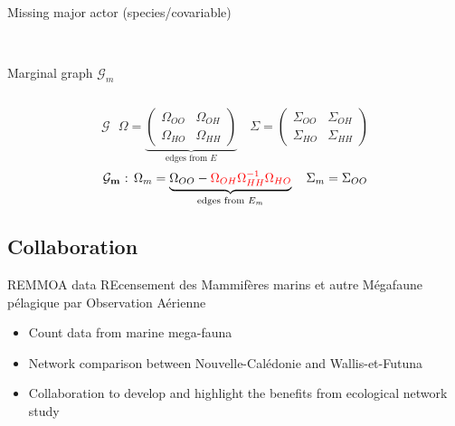 \documentclass[9pt]{beamer}
\newcommand{\emphase}[1]{\textcolor{Complement}{#1}}
\begin{document}
\begin{frame}{Missing major actor (species/covariable)}
\begin{columns}
\begin{column}{0.35\linewidth}
\begin{center}
\\


Marginal graph $\mathcal{G}_m$
\end{center}
\end{column}
\end{columns}
\vspace{0.2cm}
$$\mathbf{\mathcal{G}}\text{ }\Omega=\underbrace{\begin{pmatrix}
\Omega_{OO} & \Omega_{OH} \\ 
\Omega_{HO} & \Omega_{HH}
\end{pmatrix}}_{\text{edges from }E}  \quad \Sigma=\begin{pmatrix}
\Sigma_{OO} & \Sigma_{OH} \\ 
\Sigma_{HO} & \Sigma_{HH}
\end{pmatrix}$$
\vspace{0.4cm}
$$\mathbf{\mathcal{G}_m}\text{ : }\Omega_m= \underbrace{\Omega_{OO} - \color{red}\Omega_{OH}\Omega_{HH}^{-1}\Omega_{HO}}_{\text{edges from }E_m}\color{black} \quad \Sigma_m = \Sigma_{OO}$$

\end{frame}
\subsection{Collaboration}
\begin{frame}{REMMOA data}
\Large{
\emphase{RE}censement des \emphase{M}ammifères marins et autre \emphase{M}égafaune pélagique par \emphase{O}bservation \emphase{A}érienne}\\\bigskip
\normalsize{
\begin{itemize}
	\item Count data from marine mega-fauna
	\item Network comparison between Nouvelle-Calédonie and Wallis-et-Futuna
	\item Collaboration to develop and highlight the benefits from ecological network study 
\end{itemize}
}
\end{frame}

\section{}
\end{document}

